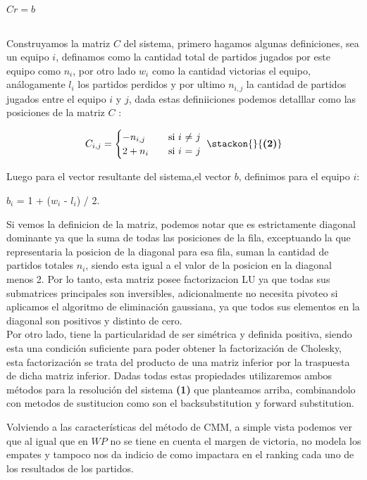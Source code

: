 \hfill $Cr=b$ \hfill {}

\\
Construyamos la matriz $C$ del sistema, primero hagamos algunas definiciones, sea un equipo $i$, definamos como la cantidad total de partidos jugados por este equipo como $n_i$, por otro lado $w_i$ como la cantidad victorias el equipo, análogamente $l_i$ los partidos perdidos y por ultimo $n_{i,j}$ la cantidad de partidos jugados entre el equipo $i$ y $j$, dada estas definiiciones  podemos detalllar como las posiciones de la matriz $C$ : 

\[ C_{i,j} =
    \begin{cases}
        -n_{i,j}       & \quad \text{si }  \text{$i$ $\neq$ $j$} \\
        2+n_i & \quad \text{si } \text{$i$ $=$ $j$ }\\
    \end{cases}\hfill \stackon{}{\textbf{(2)}}
$$
  $$  \]
                    
Luego para el vector resultante del sistema,el vector $b$, definimos para el equipo $i$:
\begin{center}
$b_i$ = 1 +  ($w_i$ - $l_i$) / 2.
\end{center}
Si vemos la definicion de la matriz, podemos notar que es estrictamente diagonal dominante ya que la suma de todas las posiciones de la fila, exceptuando la que representaria la posicion de la diagonal para esa fila, suman la cantidad de partidos totales $n_i$, siendo esta igual a el valor de la posicion en la diagonal menos 2. Por lo tanto, esta matriz posee factorizacion LU ya que todas sus submatrices principales son inversibles, adicionalmente no necesita pivoteo si aplicamos el algoritmo de eliminación gaussiana, ya que todos sus elementos en la diagonal son positivos y distinto de cero.\\
Por otro lado, tiene la particularidad de ser simétrica y definida positiva, siendo esta una condición suficiente para poder obtener la factorización de Cholesky, esta factorización se trata del producto de una matriz inferior por la traspuesta de dicha matriz inferior. Dadas todas estas propiedades utilizaremos ambos métodos para la resolución del sistema \textbf{}\textbf{(1)} que planteamos arriba, combinandolo con metodos de sustitucion como son el backsubstitution y forward substitution.

Volviendo a las características del método de CMM, a simple vista podemos ver que al igual que en $WP$ no se tiene en cuenta el margen de victoria, no modela los empates y tampoco nos da indicio de como impactara en el ranking cada uno de los resultados de los partidos. 

